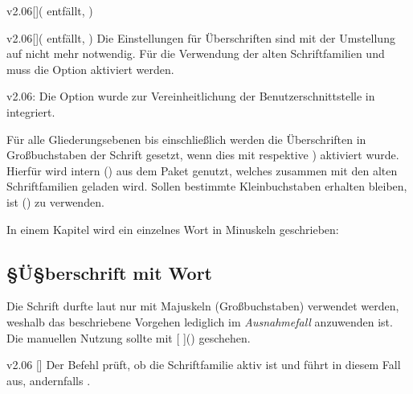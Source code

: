 \begin{Obsolete}{v2.06}[]{}(%
  entfällt, %
)
\begin{Obsolete}{v2.06}[]{}(%
  entfällt, %
)
\printobsoletelist%
%
Die Einstellungen für Überschriften sind mit der Umstellung auf \OpenSans nicht 
mehr notwendig. Für die Verwendung der alten Schriftfamilien \Univers und \DIN 
muss die Option  aktiviert werden.
\end{Obsolete}
\end{Obsolete}

\begin{Obsolete}{v2.06:}{%
}
\printobsoletelist%
%
Die Option  wurde zur Vereinheitlichung der 
Benutzerschnittstelle in  integriert.
\end{Obsolete}


%
Für alle Gliederungsebenen bis einschließlich  werden 
die Überschriften in Großbuchstaben der Schrift \DIN gesetzt, wenn dies mit  
 respektive ) aktiviert 
wurde. Hierfür wird intern () aus 
dem Paket  genutzt, welches zusammen mit den alten 
Schriftfamilien geladen wird. Sollen bestimmte Kleinbuchstaben erhalten 
bleiben, ist () zu verwenden.
%
\begin{Example}
In einem Kapitel wird ein einzelnes Wort in Minuskeln geschrieben:
\begin{Code}[escapechar=§]
\chapter{§Ü§berschrift mit  Wort}
\end{Code}
\end{Example}
%
Die Schrift \DIN durfte laut \CD nur mit Majuskeln (Großbuchstaben) verwendet 
werden, weshalb das beschriebene Vorgehen lediglich im \emph{Ausnahmefall} 
anzuwenden ist. Die manuellen Nutzung sollte mit 
[%
]() geschehen.

\begin{Obsolete}{v2.06}{%
  []
}%
\printobsoletelist%
%
Der Befehl  prüft, ob die Schriftfamilie \DIN aktiv ist und führt 
in diesem Fall  aus, andernfalls . 
\end{Obsolete}



